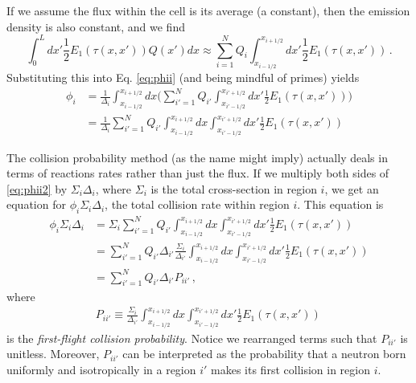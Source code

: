 If we assume the flux within the cell is its average (a constant), then the emission density is also constant, and we find
\begin{equation}
  \int^L_0  dx' \frac{1}{2} E_1(\tau(x,x')) Q(x')  dx \approx \sum^N_{i=1}  Q_i \int^{x_{i+1/2}}_{x_{i-1/2}} dx' \frac{1}{2} E_1(\tau(x,x'))  \, .
\end{equation}
Substituting this into Eq. \ref{eq:phii} (and being mindful of primes) yields
\begin{equation}
\begin{split}
 \phi_i &= \frac{1}{\Delta_i} \int^{x_{i+1/2}}_{x_{i-1/2}} dx \Bigg ( \sum^N_{i'=1} Q_{i'} \int^{x_{i'+1/2}}_{x_{i'-1/2}} dx' \frac{1}{2}E_1(\tau(x,x')) \Bigg )  \\
        &= \frac{1}{\Delta_i}  \sum^N_{i'=1} Q_{i'} \int^{x_{i+1/2}}_{x_{i-1/2}} dx \int^{x_{i'+1/2}}_{x_{i'-1/2}} dx' \frac{1}{2} E_1(\tau(x,x')) 
\end{split}
\label{eq:phii2}
\end{equation}

The collision probability method (as the name might imply) actually deals in terms of reactions rates rather than just the flux.  If we multiply both sides of  \ref{eq:phii2} by $\Sigma_i \Delta_i$, where $\Sigma_i$ is the total cross-section in region $i$, we get an equation for $\phi_i \Sigma_i \Delta_i$, the total collision rate within region $i$.  This equation is
\begin{equation}
\begin{split}
 \phi_i \Sigma_i \Delta_i &= \Sigma_{i} \sum^N_{i'=1} Q_{i'} \int^{x_{i+1/2}}_{x_{i-1/2}} dx \int^{x_{i'+1/2}}_{x_{i'-1/2}} dx' \frac{1}{2} E_1(\tau(x,x'))   \\
        &=  \sum^N_{i'=1} Q_{i'} \Delta_{i'} \frac{\Sigma_{i}}{\Delta_{i'}} \int^{x_{i+1/2}}_{x_{i-1/2}} dx \int^{x_{i'+1/2}}_{x_{i'-1/2}} dx' \frac{1}{2} E_1(\tau(x,x'))  \\
        &= \sum^N_{i'=1} Q_{i'} \Delta_{i'} P_{ii'} \, ,
\end{split}
\label{eq:cpmeqs}
\end{equation}
where 
\begin{equation}
\begin{split}
 P_{ii'} \equiv\frac{\Sigma_{i}}{\Delta_{i'}} \int^{x_{i+1/2}}_{x_{i-1/2}} dx \int^{x_{i'+1/2}}_{x_{i'-1/2}} dx' \frac{1}{2} E_1(\tau(x,x')) \, 
\end{split}
\label{eq:firstflightcollprob}
\end{equation}
is the \textit{first-flight collision probability}.  Notice we rearranged terms such that $P_{ii'}$ is unitless.  Moreover, $P_{ii'}$ can be interpreted as the probability that a neutron born uniformly and isotropically in a region $i'$ makes its first collision in region $i$.

